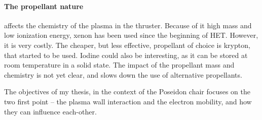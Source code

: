 \paragraph{The propellant nature} affects the chemistry of the plasma in the thruster.
Because of it high mass and low ionization energy, xenon has been used since the beginning of \ac{HET}. 
However, it is very costly.
The cheaper, but less effective, propellant of choice is krypton, that started to be used.
Iodine could also be interesting, as it can be stored at room temperature in a solid state.
The impact of the propellant mass and chemistry is not yet clear, and slows down the use of alternative propellants.

\vspace{1em}
The objectives of my thesis, in the context of the {\sc Poseidon} chair focuses on the two first point -- the plasma wall interaction and the electron mobility, and how they can influence each-other.





